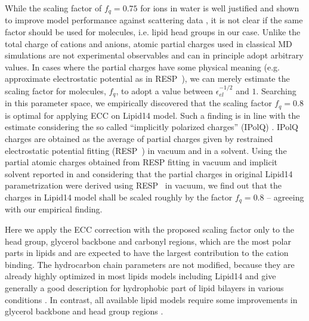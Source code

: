 \documentclass[aip,jcp,twocolumn]{revtex4}
\begin{document}
While the scaling factor of $f_q = 0.75$ for ions in water is well justified and shown
to improve model performance against scattering data \cite{kohagen14,kohagen16, Pluharova2014},
it is not clear if the same factor should be used for molecules, i.e. lipid head groups in our case. 
Unlike the total charge of cations and anions, atomic partial charges used in
classical MD simulations are not experimental observables and 
can in principle adopt arbitrary values. 
In cases where the partial charges have some physical meaning 
(e.g. approximate electrostatic potential as in RESP~\cite{RESP_paper}),
we can merely estimate the scaling factor for molecules, $f_q$, 
to adopt a value between $\epsilon _{el} ^{-1/2}$ and $1$.
Searching in this parameter space, we empirically discovered that
the scaling factor $f_q = 0.8$ is optimal for applying ECC on Lipid14 model. 
Such a finding is in line with the estimate considering the
so called ``implicitly polarized charges'' (IPolQ) \cite{ipolq2013}.
IPolQ charges are obtained as the average of partial charges given by 
restrained electrostatic potential fitting (RESP~\cite{RESP_paper}) 
in vacuum and in a solvent.
Using the partial atomic charges obtained from RESP fitting in vacuum and implicit solvent reported in \cite{maciejewski14} and
considering that the partial charges in original Lipid14 parametrization were derived using RESP~\cite{RESP_paper} in vacuum,
we find out that the charges in Lipid14 model shall be scaled roughly by the factor $f_q=0.8$ 
-- agreeing with our empirical finding. 

Here we apply the ECC correction with the proposed scaling factor only to the head group,
glycerol backbone and carbonyl regions, which are the most polar parts in lipids and
are expected to have the largest contribution to the cation binding.
The hydrocarbon chain parameters are not modified, because they are
already highly optimized in most lipids models including Lipid14 and
give generally a good description for hydrophobic part of lipid bilayers
in various conditions \cite{ollila16}.
In contrast, all available lipid models require
some improvements in glycerol backbone and head group regions \cite{botan15}. 
\end{document}
